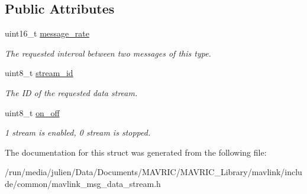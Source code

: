 \subsection*{Public Attributes}
\begin{DoxyCompactItemize}
\item 
\hypertarget{struct____mavlink__data__stream__t_a351a00b81ef679d4fa73048257494bbc}{uint16\+\_\+t \hyperlink{struct____mavlink__data__stream__t_a351a00b81ef679d4fa73048257494bbc}{message\+\_\+rate}}\label{struct____mavlink__data__stream__t_a351a00b81ef679d4fa73048257494bbc}

\begin{DoxyCompactList}\small\item\em The requested interval between two messages of this type. \end{DoxyCompactList}\item 
\hypertarget{struct____mavlink__data__stream__t_aaac4584f5e5677fe70edee1c53565b53}{uint8\+\_\+t \hyperlink{struct____mavlink__data__stream__t_aaac4584f5e5677fe70edee1c53565b53}{stream\+\_\+id}}\label{struct____mavlink__data__stream__t_aaac4584f5e5677fe70edee1c53565b53}

\begin{DoxyCompactList}\small\item\em The I\+D of the requested data stream. \end{DoxyCompactList}\item 
\hypertarget{struct____mavlink__data__stream__t_ae0ec7bd3a3fd38496e2a6aaa3b39daca}{uint8\+\_\+t \hyperlink{struct____mavlink__data__stream__t_ae0ec7bd3a3fd38496e2a6aaa3b39daca}{on\+\_\+off}}\label{struct____mavlink__data__stream__t_ae0ec7bd3a3fd38496e2a6aaa3b39daca}

\begin{DoxyCompactList}\small\item\em 1 stream is enabled, 0 stream is stopped. \end{DoxyCompactList}\end{DoxyCompactItemize}


The documentation for this struct was generated from the following file\+:\begin{DoxyCompactItemize}
\item 
/run/media/julien/\+Data/\+Documents/\+M\+A\+V\+R\+I\+C/\+M\+A\+V\+R\+I\+C\+\_\+\+Library/mavlink/include/common/mavlink\+\_\+msg\+\_\+data\+\_\+stream.\+h\end{DoxyCompactItemize}

